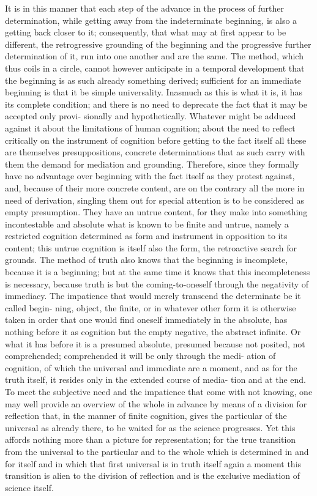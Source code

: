 It is in this manner that each step of the advance in the process of further
determination, while getting away from the indeterminate beginning,
is also a getting back closer to it;
consequently, that what may at first appear to be different,
the retrogressive grounding of the beginning
and the progressive further determination of it,
run into one another and are the same.
The method, which thus coils in a circle,
cannot however anticipate in a temporal development that the beginning is as such already something
derived; sufficient for an immediate beginning is that it be simple universality.
Inasmuch as this is what it is, it has its complete condition;
and there is no need to deprecate the fact that it may be accepted only provi-
sionally and hypothetically.
Whatever might be adduced against it about
the limitations of human cognition;
about the need to reflect critically
on the instrument of cognition
before getting to the fact itself
 all these are themselves presuppositions,
concrete determinations that as such carry
with them the demand for mediation and grounding.
Therefore, since they formally have no advantage over beginning with the fact itself as they
protest against, and, because of their more concrete content, are on the
contrary all the more in need of derivation, singling them out for special
attention is to be considered as empty presumption. They have an untrue
content, for they make into something incontestable and absolute what is
known to be finite and untrue, namely a restricted cognition determined as
form and instrument in opposition to its content; this untrue cognition is itself
also the form, the retroactive search for grounds.
 The method of truth also
knows that the beginning is incomplete, because it is a beginning; but at
the same time it knows that this incompleteness is necessary, because truth
is but the coming-to-oneself through the negativity of immediacy. The
impatience that would merely transcend the determinate
 be it called begin-
ning, object, the finite, or in whatever other form it is otherwise taken
in order that one would find oneself immediately in the absolute, has
nothing before it as cognition but the empty negative, the abstract infinite.
Or what it has before it is a presumed absolute, presumed because not
posited, not comprehended; comprehended it will be only through the medi-
ation of cognition, of which the universal and immediate are a moment,
and as for the truth itself, it resides only in the extended course of media-
tion and at the end.
 To meet the subjective need and the impatience that
come with not knowing, one may well provide an overview of the whole in
advance
 by means of a division for reflection that, in the manner of finite
cognition, gives the particular of the universal as already there, to be waited
for as the science progresses. Yet this affords nothing more than a picture
for representation; for the true transition from the universal to the particular
and to the whole which is determined in and for itself and in which that
first universal is in truth itself again a moment
 this transition is alien to
the division of reflection and is the exclusive mediation of science itself.

